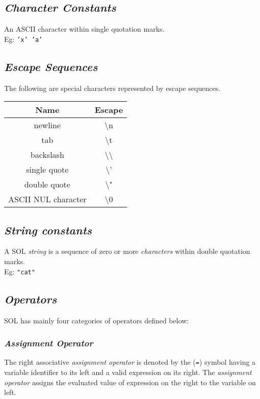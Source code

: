 \documentclass[letterpaper,12pt]{article}
\begin{document}
    \subsection{\textit{Character Constants}}
    An ASCII character within single quotation marks.\\
    Eg: \texttt{'x' 'a'}

    \subsection{\textit{Escape Sequences}}
    The following are special characters represented by escape sequences.
        \begin{center}
            \begin{tabular}{ |c|c| }
            \hline
                \textbf{Name}   & \textbf{Escape}\\
                \hline
                newline         & \textbackslash n\\
                tab             & \textbackslash t\\
                backslash       & \textbackslash \textbackslash\\
                single quote    & \textbackslash '\\
                double quote    & \textbackslash "\\
                ASCII NUL character & \textbackslash 0\\
            \hline
            \end{tabular}
        \end{center}

    \subsection{\textit{String constants}}
    A SOL \textit{string} is a sequence of zero or more \textit{characters} within double quotation marks.\\
    Eg: \texttt{"cat"}

	\subsection{\textit{Operators}}
    SOL has mainly four categories of operators defined below:

        \subsubsection{\textit{Assignment Operator}}
        The right associative \textit{assignment operator} is denoted by the (\texttt{=}) symbol having a variable identifier to its left and a valid expression on its right. The \textit{assignment operator} assigns the evaluated value of expression on the right to the variable on left.
\end{document}
